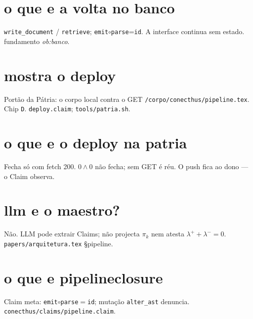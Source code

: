 \documentclass[11pt,a4paper]{article}
\newcommand{\code}[1]{\texttt{\small #1}}
\begin{document}
\section{o que e a volta no banco}
\code{write\_document} / \code{retrieve}; \code{emit}$\circ$\code{parse}=\code{id}.
A interface continua sem estado. fundamento \emph{ob:banco}.

\section{mostra o deploy}
Portão da Pátria: o corpo local contra o GET
\code{/corpo/conecthus/pipeline.tex}. Chip \code{D}.
\code{deploy.claim}; \code{tools/patria.sh}.

\section{o que e o deploy na patria}
Fecha só com fetch 200. $0\wedge0$ não fecha; sem GET é réu.
O push fica ao dono --- o Claim observa.

\section{llm e o maestro?}
Não. LLM pode extrair Claims; não projecta $\pi_k$ nem atesta
$\lambda^{+}+\lambda^{-}=0$. \code{papers/arquitetura.tex} \S pipeline.

\section{o que e pipelineclosure}
Claim meta: \code{emit}$\circ$\code{parse}$=$\code{id}; mutação
\code{alter\_ast} denuncia. \code{conecthus/claims/pipeline.claim}.
\end{document}
